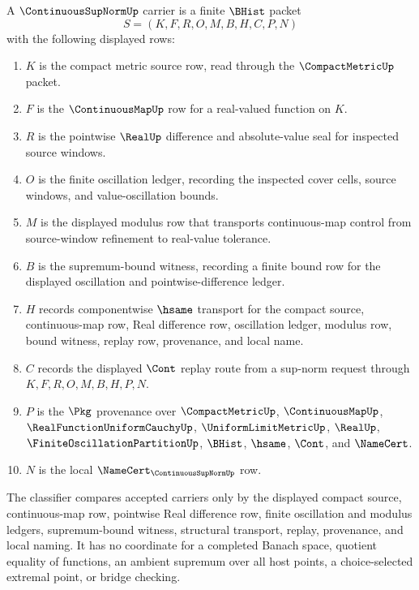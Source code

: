 \begin{definition}
\label{def:continuous-supnorm-carrier}
A $\ContinuousSupNormUp$ carrier is a finite $\BHist$ packet
$$
S=(K,F,R,O,M,B,H,C,P,N)
$$
with the following displayed rows:
\begin{enumerate}
\item $K$ is the compact metric source row, read through the $\CompactMetricUp$ packet.
\item $F$ is the $\ContinuousMapUp$ row for a real-valued function on $K$.
\item $R$ is the pointwise $\RealUp$ difference and absolute-value seal for inspected source windows.
\item $O$ is the finite oscillation ledger, recording the inspected cover cells, source windows, and value-oscillation bounds.
\item $M$ is the displayed modulus row that transports continuous-map control from source-window refinement to real-value tolerance.
\item $B$ is the supremum-bound witness, recording a finite bound row for the displayed oscillation and pointwise-difference ledger.
\item $H$ records componentwise $\hsame$ transport for the compact source, continuous-map row, Real difference row, oscillation ledger, modulus row, bound witness, replay row, provenance, and local name.
\item $C$ records the displayed $\Cont$ replay route from a sup-norm request through $K,F,R,O,M,B,H,P,N$.
\item $P$ is the $\Pkg$ provenance over $\CompactMetricUp$, $\ContinuousMapUp$, $\RealFunctionUniformCauchyUp$, $\UniformLimitMetricUp$, $\RealUp$, $\FiniteOscillationPartitionUp$, $\BHist$, $\hsame$, $\Cont$, and $\NameCert$.
\item $N$ is the local $\NameCert_{\ContinuousSupNormUp}$ row.
\end{enumerate}
The classifier compares accepted carriers only by the displayed compact source, continuous-map row, pointwise Real difference row, finite oscillation and modulus ledgers, supremum-bound witness, structural transport, replay, provenance, and local naming. It has no coordinate for a completed Banach space, quotient equality of functions, an ambient supremum over all host points, a choice-selected extremal point, or bridge checking.
\label{def:continuous-sup-norm-carrier}
\end{definition}

